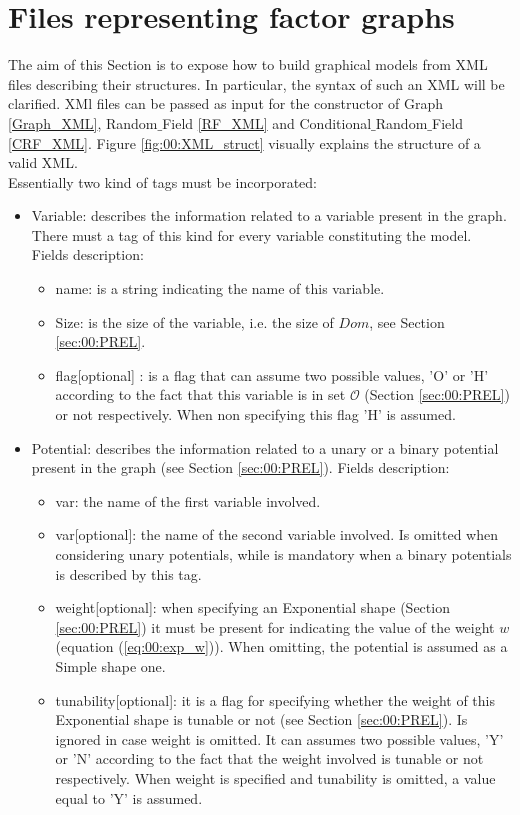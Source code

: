 \newpage
\chapter{Files representing factor graphs}
\label{00_XML_format}

The aim of this Section is to expose how to build graphical models from XML files describing their structures.
In particular, the syntax of such an XML will be clarified.
XMl files can be passed as input for the constructor of Graph \ref{Graph_XML}, Random$\_$Field \ref{RF_XML} and  Conditional$\_$Random$\_$Field \ref{CRF_XML}.
Figure \ref{fig:00:XML_struct} visually explains the structure of a valid XML.
\\
Essentially two kind of tags must be incorporated:
\begin{itemize}
\item Variable: describes the information related to a variable present in the graph. There must a tag of this kind for every variable constituting the model. Fields description:
\begin{itemize}
\item name: is a string indicating the name of this variable.
\item Size: is the size of the variable, i.e. the size of $Dom$, see Section \ref{sec:00:PREL}.
\item flag[optional] : is a flag that can assume two possible values, 'O' or 'H' according to the fact that this variable is in set $\mathcal{O}$ (Section \ref{sec:00:PREL}) or not respectively. When non specifying this flag 'H' is assumed.
\end{itemize}
\item Potential: describes the information related to a unary or a binary potential present in the graph (see Section \ref{sec:00:PREL}).
Fields description:
\begin{itemize}
\item var: the name of the first variable involved.
\item var[optional]: the name of the second variable involved. Is omitted when considering unary potentials, while is mandatory when a binary potentials is described by this tag.
\item weight[optional]: when specifying an Exponential shape (Section \ref{sec:00:PREL}) it must be present for indicating the value of the weight $w$ (equation (\ref{eq:00:exp_w})). When omitting, the potential is assumed as a Simple shape one.
\item tunability[optional]: it is a flag for specifying whether the weight of this Exponential shape is tunable or not (see Section \ref{sec:00:PREL}). Is ignored in case weight is omitted. It can assumes two possible values, 'Y' or 'N' according to the fact that the weight involved is tunable or not respectively. When weight is specified and tunability is omitted, a value equal to 'Y' is assumed.

\end{itemize}
\end{itemize}
